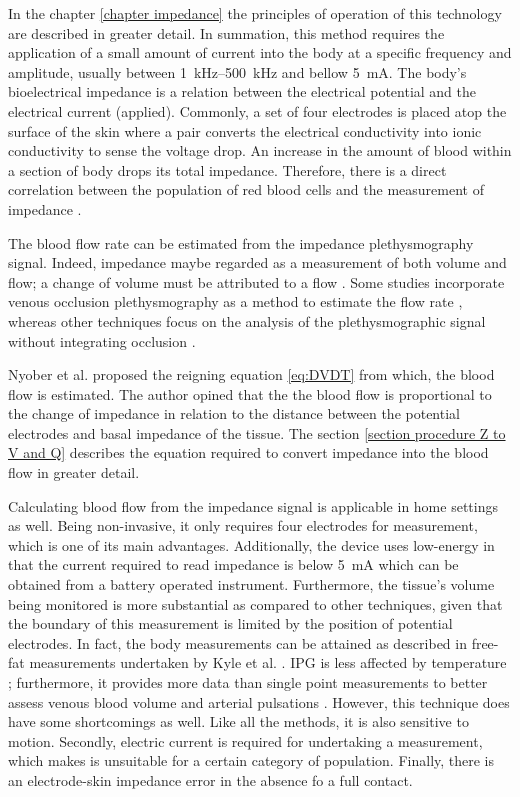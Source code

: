 In the chapter \ref{chapter impedance} the principles of operation of this technology are described in greater detail. In summation, this method requires the application of a small amount of current into the body at a specific frequency and amplitude, usually between \SIrange{1}{500}{\kHz} \cite{kyle2004bioelectrical} and bellow \SI{5}{\mA}. The body's bioelectrical impedance is a relation between the electrical potential and the electrical current (applied). Commonly, a set of four electrodes is placed atop the surface of the skin where a pair converts the electrical conductivity into ionic conductivity to sense the voltage drop. An increase in the amount of blood within a section of body drops its total impedance. Therefore, there is a direct correlation between the population of red blood cells and the measurement of impedance \cite{mattern1957determination}. 

The blood flow rate can be estimated from the impedance plethysmography signal. Indeed, impedance maybe regarded as a measurement of both volume and flow; a change of volume must be attributed to a flow \cite{martinsen2011bioimpedance}. Some studies incorporate venous occlusion plethysmography as a method to estimate the flow rate \cite{mohapatra1979measurement, costeloe1980continuous, yamakoshi1980limb}, whereas other techniques focus on the analysis of the plethysmographic signal without integrating occlusion \cite{porter1985measurement,corciova2011peripheral, brown1975impedance, marks1985computer}. 

Nyober et al. \cite{nyober1950electrical} proposed the reigning equation \ref{eq:DVDT} from which, the blood flow is estimated. The author opined that the the blood flow is proportional to the change of impedance in relation to the distance between the potential electrodes and basal impedance of the tissue. The section \ref{section procedure Z to V and Q} describes the equation required to convert impedance into the blood flow in greater detail.

Calculating blood flow from the impedance signal is applicable in home settings as well. Being non-invasive, it only requires four electrodes for measurement, which is one of its main advantages. Additionally, the device uses low-energy in that the current required to read impedance is below \SI{5}{\mA} which can be obtained from a battery operated instrument. Furthermore, the tissue's volume being monitored is more substantial as compared to other techniques, given that the boundary of this measurement is limited by the position of potential electrodes. In fact, the body measurements can be  attained as described in free-fat measurements undertaken by Kyle et al. \cite{kyle2004bioelectrical}. IPG is less affected by temperature \cite{bera2014bioelectrical}; furthermore, it provides more data than single point measurements to better assess venous blood volume and arterial pulsations \cite{bera2014bioelectrical}. However, this technique does have some shortcomings as well.   Like all the methods, it is also sensitive to motion. Secondly, electric current is required for undertaking a measurement, which makes is unsuitable for a certain category of population. Finally, there is an electrode-skin impedance error in the absence fo a full contact. 

